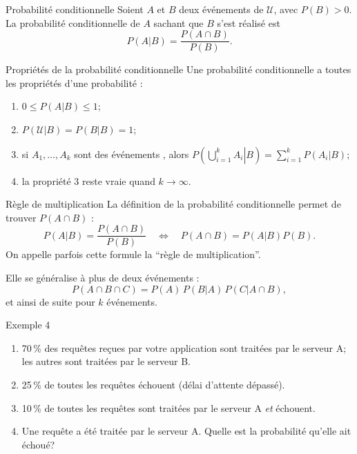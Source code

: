 \documentclass{BeamerTemplate}
\newcommand{\cibleReponse}{}
\newcommand{\lienreponse}[1]{\gdef\cibleReponse{#1}}
\begin{document}
\begin{frame}[t]
 \begin{Boite}{Probabilité conditionnelle}
  Soient $A$ et $B$ deux événements de $\mathcal{U}$, avec $P(B)>0$. La
  \alert{probabilité conditionnelle} de $A$ sachant que $B$ s'est réalisé est
  $$P(A|B)=\frac{P(A\cap B)}{P(B)}.$$
 \end{Boite}
\end{frame}

\begin{frame}[t]{Propriétés de la probabilité conditionnelle}
 Une probabilité conditionnelle a toutes les propriétés d'une probabilité :

 \begin{enumerate}\itemsep3mm
  \item $0\le P(A|B)\le 1$;
  \item $P(\mathcal{U}|B)=P(B|B)=1$;
  \item si $A_1,\ldots,A_k$ sont des événements , alors $P\left(\left.\bigcup\limits_{i=1}^kA_i\right|B\right)=\sum\limits_{i=1}^k P(A_i|B)$;
  \item la propriété 3 reste vraie quand $k\to\infty$.
 \end{enumerate}
\end{frame}

\begin{frame}[t]{Règle de multiplication}
La définition de la probabilité conditionnelle permet de trouver $P(A\cap B)$ :
$$P(A|B)=\frac{P(A\cap B)}{P(B)}\quad\Leftrightarrow\quad P(A\cap B)=P(A|B)P(B).$$
On appelle parfois cette formule la \enquote{règle de multiplication}.

\medskip
Elle se généralise à plus de deux événements :
$$P(A\cap B\cap C)=P(A)\,P(B|A)\,P(C|A\cap B),$$
et ainsi de suite pour $k$ événements.
\end{frame}
\begin{frame}[t,label=ex4]{Exemple 4}

{\small
 \begin{enumerate}[$\bullet$]\itemsep3mm
 \item 70\,\% des requêtes reçues par votre application sont traitées par le serveur A; les autres sont traitées par le serveur B.
 \item 25\,\% de toutes les requêtes échouent (délai d'attente dépassé).
 \item 10\,\% de toutes les requêtes sont traitées par le serveur A \emph{et} échouent.
 \item[a)] Une requête a été traitée par le serveur A. Quelle est la probabilité qu'elle ait échoué?
     \end{enumerate}
     }
\lienreponse{rep-ex1}
\end{frame}
\end{document}
